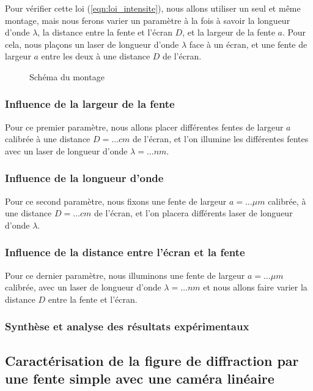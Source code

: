 \documentclass[12pt]{article}
\begin{document}
Pour vérifier cette loi (\ref{eqn:loi_intensite}), nous allons utiliser un seul et même montage, mais nous ferons varier un paramètre à la fois à savoir la longueur d'onde $\lambda$, la distance entre la fente et l'écran $D$, 
et la largeur de la fente $a$. Pour cela, nous plaçons un laser de longueur d'onde $\lambda$ face à un écran, et une fente de largeur $a$ entre les deux à une distance $D$ de l'écran.

\begin{figure}[!h]
    \begin{center}
        \resizebox{0.7\textwidth}{5cm}{
        
        }
    \end{center}
    \caption{Schéma du montage}
\end{figure}

\subsubsection{Influence de la largeur de la fente}
Pour ce premier paramètre, nous allons placer différentes fentes de largeur $a$ calibrée à une distance $D = \dots cm$ de l'écran, et l'on illumine les différentes fentes avec un laser de longueur d'onde
$\lambda = \dots nm$. 

\subsubsection{Influence de la longueur d'onde}
Pour ce second paramètre, nous fixons une fente de largeur $a = \dots \mu m$ calibrée, à une distance $D = \dots cm$ de l'écran, et l'on placera différents laser de longueur d'onde $\lambda$.

\subsubsection{Influence de la distance entre l'écran et la fente}
Pour ce dernier paramètre, nous illuminons une fente de largeur $a = \dots \mu m$ calibrée, avec un laser de longueur d'onde $\lambda = \dots nm$ et nous allons faire varier la distance $D$ entre la fente et l'écran.

\subsubsection{Synthèse et analyse des résultats expérimentaux}

\break
\subsection{Caractérisation de la figure de diffraction par une fente simple avec une caméra linéaire}
\end{document}
